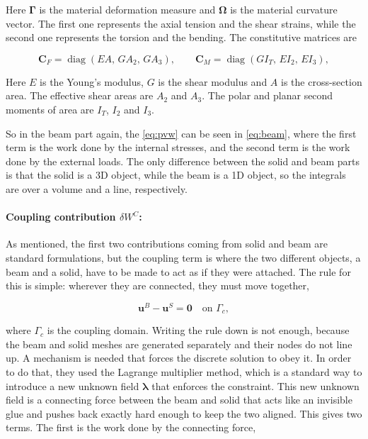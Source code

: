 Here $\boldsymbol{\Gamma}$ is the material deformation measure and $\boldsymbol{\Omega}$ is the material curvature vector. The first one represents the axial tension and the shear strains, while the second one represents the torsion and the bending. The constitutive matrices are

\begin{equation}
  \boldsymbol{C}_F = \operatorname{diag}(EA,\, GA_2,\, GA_3) , \qquad \boldsymbol{C}_M = \operatorname{diag}(GI_T,\, EI_2,\, EI_3) , \label{eq:constitutive}
\end{equation}

Here $E$ is the Young's modulus, $G$ is the shear modulus and $A$ is the cross-section area. The effective shear areas are $A_2$ and $A_3$. The polar and planar second moments of area are $I_T$, $I_2$ and $I_3$.

So in the beam part again, the \cref{eq:pvw} can be seen in \cref{eq:beam}, where the first term is the work done by the internal stresses, and the second term is the work done by the external loads. The only difference between the solid and beam parts is that the solid is a 3D object, while the beam is a 1D object, so the integrals are over a volume and a line, respectively.

\paragraph{Coupling contribution $\delta W^C$:} As mentioned, the first two contributions coming from solid and beam are standard formulations, but the coupling term is where the two different objects, a beam and a solid, have to be made to act as if they were attached. The rule for this is simple: wherever they are connected, they must move together,

\begin{equation}
  \boldsymbol{u}^B - \boldsymbol{u}^S = \boldsymbol{0} \quad \text{on } \Gamma_c , \label{eq:constraint}
\end{equation}

where $\Gamma_c$ is the coupling domain. Writing the rule down is not enough, because the beam and solid meshes are generated separately and their nodes do not line up. A mechanism is needed that forces the discrete solution to obey it. In order to do that, they used the Lagrange multiplier method, which is a standard way to introduce a new unknown field $\boldsymbol{\lambda}$ that enforces the constraint. This new unknown field is a connecting force between the beam and solid that acts like an invisible glue and pushes back exactly hard enough to keep the two aligned. This gives two terms. The first is the work done by the connecting force,

